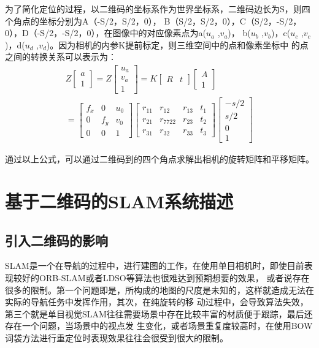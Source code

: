 为了简化定位的过程，以二维码的坐标系作为世界坐标系，二维码边长为S，则四个角点的坐标分别为A（-S/2，S/2，0），
B（S/2，S/2，0），C（S/2，-S/2，0），D（-S/2，-S/2，0），在图像中的对应像素点为a($u_a$ ,$v_a$)，
b($u_b$ ,$v_b$)，c($u_c$ ,$v_c$)，d($u_d$ ,$v_d$)。因为相机的内参K提前标定，则三维空间中的点和像素坐标中
的点之间的转换关系可以表示为：
\begin{equation}
\begin{split}
  Z{
  \left[ \begin{array}{ccc}
  a\\1
  \end{array} 
  \right ]}=Z{
  \left[ \begin{array}{ccc}
  u_a\\v_a\\1
  \end{array} \right ]}=K{
  \left[ \begin{array}{ccc}
  R&t
  \end{array} \right ]}{
  \left[ \begin{array}{ccc}
  A\\1
  \end{array} \right ]} \\
  ={
  \left[ \begin{array}{ccc}
  f_x & 0 & u_0\\0 & f_y &v_0 \\0 & 0 & 1
  \end{array} \right ]}{
  \left[ \begin{array}{cccc}
  r_{11}&r_{12}&r_{13}&t_1\\r_{21}&r_{7722}&r_{23}&t_2\\r_{31}&r_{32}&r_{33}&t_3
  \end{array} \right ]}{
  \left[ \begin{array}{ccc}
  -s/2\\s/2\\0\\1
  \end{array} \right ]}
\end{split}
\end{equation}

通过以上公式，可以通过二维码到的四个角点求解出相机的旋转矩阵和平移矩阵。
\section{基于二维码的SLAM系统描述}
\label{sec:2.3}

\subsection{引入二维码的影响}
\label{sec:2.3.1}
SLAM是一个在导航的过程中，进行建图的工作，在使用单目相机时，即使目前表现较好的ORB-SLAM或者LDSO等算法也很难达到预期想要的效果，
或者说存在很多的限制。第一个问题即是，所构成的地图的尺度是未知的，这样就造成无法在实际的导航任务中发挥作用，其次，在纯旋转的移
动过程中，会导致算法失效，第三个就是单目视觉SLAM往往需要场景中存在比较丰富的材质便于跟踪，最后还存在一个问题，当场景中的视点发
生变化，或者场景重复度较高时，在使用BOW词袋方法进行重定位时表现效果往往会很受到很大的限制。

